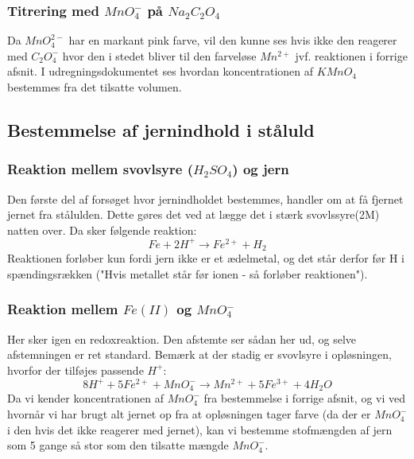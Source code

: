 \subsubsection{Titrering med $MnO_4^{-}$ på $Na_2C_2O_4$}
Da $MnO_4^{2-}$ har en markant pink farve, vil den kunne ses hvis ikke den reagerer med $C_2O_4^{-}$ hvor den i stedet bliver til den farveløse $Mn^{2+}$ jvf. reaktionen i forrige afsnit. 
I udregningsdokumentet ses hvordan koncentrationen af $KMnO_4$ bestemmes fra det tilsatte volumen.

\subsection{Bestemmelse af jernindhold i ståluld}
\subsubsection{Reaktion mellem svovlsyre ($H_2 SO_4$) og jern}
Den første del af forsøget hvor jernindholdet bestemmes, handler om at få fjernet jernet fra stålulden. 
Dette gøres det ved at lægge det i stærk svovlssyre(2M) natten over. 
Da sker følgende reaktion:
$$  Fe + 2 H^+ \rightarrow Fe^{2+} + H_2  $$
Reaktionen forløber kun fordi jern ikke er et ædelmetal, og det står derfor før H i spændingsrækken ("Hvis metallet står før ionen - så forløber reaktionen").

\subsubsection{Reaktion mellem $Fe(II)$ og $MnO_4^-$}
Her sker igen en redoxreaktion.
Den afstemte ser sådan her ud, og selve afstemningen er ret standard. 
Bemærk at der stadig er svovlsyre i opløsningen, hvorfor der tilføjes passende $H^+$:
$$ 8H^+ + 5 Fe^{2+} + MnO_4^- \rightarrow Mn^{2+} + 5 Fe^{3+} + 4 H_2O $$
Da vi kender koncentrationen af $MnO_4^-$ fra bestemmelse i forrige afsnit, og vi ved hvornår vi har brugt alt jernet op fra at opløsningen tager farve (da der er $MnO_4^-$ i den hvis det ikke reagerer med jernet), kan vi bestemme stofmængden af jern som 5 gange så stor som den tilsatte mængde $MnO_4^-$.